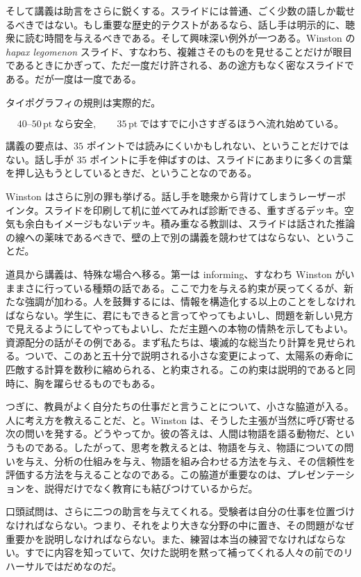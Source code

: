 そして講義は助言をさらに鋭くする。スライドには普通、ごく少数の語しか載せるべきではない。もし重要な歴史的テクストがあるなら、話し手は明示的に、聴衆に読む時間を与えるべきである。そして興味深い例外が一つある。Winston の \emph{hapax legomenon} スライド、すなわち、複雑さそのものを見せることだけが眼目であるときにかぎって、ただ一度だけ許される、あの途方もなく密なスライドである。だが一度は一度である。

タイポグラフィの規則は実際的だ。

\begin{equation}
40\text{--}50\,\mathrm{pt}\ \text{なら安全}, \qquad 35\,\mathrm{pt}\ \text{ではすでに小さすぎるほうへ流れ始めている。}
\end{equation}

講義の要点は、\(35\) ポイントでは読みにくいかもしれない、ということだけではない。話し手が \(35\) ポイントに手を伸ばすのは、スライドにあまりに多くの言葉を押し込もうとしているときだ、ということなのである。

Winston はさらに別の罪も挙げる。話し手を聴衆から背けてしまうレーザーポインタ。スライドを印刷して机に並べてみれば診断できる、重すぎるデッキ。空気も余白もイメージもないデッキ。積み重なる教訓は、スライドは話された推論の線への薬味であるべきで、壁の上で別の講義を競わせてはならない、ということだ。

道具から講義は、特殊な場合へ移る。第一は informing、すなわち Winston がいままさに行っている種類の話である。ここで力を与える約束が戻ってくるが、新たな強調が加わる。人を鼓舞するには、情報を構造化する以上のことをしなければならない。学生に、君にもできると言ってやってもよいし、問題を新しい見方で見えるようにしてやってもよいし、ただ主題への本物の情熱を示してもよい。資源配分の話がその例である。まず私たちは、壊滅的な総当たり計算を見せられる。ついで、このあと五十分で説明される小さな変更によって、太陽系の寿命に匹敵する計算を数秒に縮められる、と約束される。この約束は説明的であると同時に、胸を躍らせるものでもある。

つぎに、教員がよく自分たちの仕事だと言うことについて、小さな脇道が入る。人に考え方を教えることだ、と。Winston は、そうした主張が当然に呼び寄せる次の問いを発する。どうやってか。彼の答えは、人間は物語を語る動物だ、というものである。したがって、思考を教えるとは、物語を与え、物語についての問いを与え、分析の仕組みを与え、物語を組み合わせる方法を与え、その信頼性を評価する方法を与えることなのである。この脇道が重要なのは、プレゼンテーションを、説得だけでなく教育にも結びつけているからだ。

口頭試問は、さらに二つの助言を与えてくれる。受験者は自分の仕事を位置づけなければならない。つまり、それをより大きな分野の中に置き、その問題がなぜ重要かを説明しなければならない。また、練習は本当の練習でなければならない。すでに内容を知っていて、欠けた説明を黙って補ってくれる人々の前でのリハーサルではだめなのだ。

